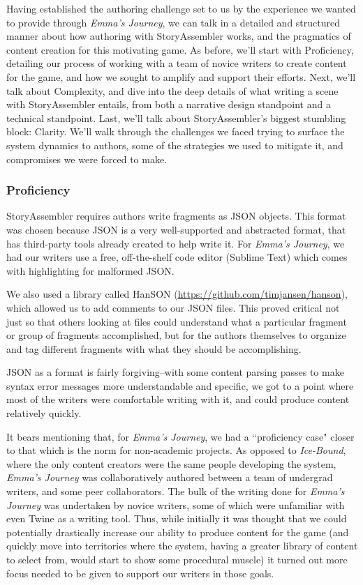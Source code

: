 Having established the authoring challenge set to us by the experience we wanted to provide through \textit{Emma's Journey}, we can talk in a detailed and structured manner about how authoring with StoryAssembler works, and the pragmatics of content creation for this motivating game. As before, we'll start with Proficiency, detailing our process of working with a team of novice writers to create content for the game, and how we sought to amplify and support their efforts. Next, we'll talk about Complexity, and dive into the deep details of what writing a scene with StoryAssembler entails, from both a narrative design standpoint and a technical standpoint. Last, we'll talk about StoryAssembler's biggest stumbling block: Clarity. We'll walk through the challenges we faced trying to surface the system dynamics to authors, some of the strategies we used to mitigate it, and compromises we were forced to make.

\subsubsection{Proficiency}

StoryAssembler requires authors write fragments as JSON objects. This format was chosen because JSON is a very well-supported and abstracted format, that has third-party tools already created to help write it. For \textit{Emma's Journey}, we had our writers use a free, off-the-shelf code editor (Sublime Text) which comes with highlighting for malformed JSON.

We also used a library called HanSON (\url{https://github.com/timjansen/hanson}), which allowed us to add comments to our JSON files. This proved critical not just so that others looking at files could understand what a particular fragment or group of fragments accomplished, but for the authors themselves to organize and tag different fragments with what they should be accomplishing.

JSON as a format is fairly forgiving--with some content parsing passes to make syntax error messages more understandable and specific, we got to a point where most of the writers were comfortable writing with it, and could produce content relatively quickly.

It bears mentioning that, for \textit{Emma's Journey}, we had a ``proficiency case" closer to that which is the norm for non-academic projects. As opposed to \textit{Ice-Bound}, where the only content creators were the same people developing the system, \textit{Emma's Journey} was collaboratively authored between a team of undergrad writers, and some peer collaborators. The bulk of the writing done for \textit{Emma's Journey} was undertaken by novice writers, some of which were unfamiliar with even Twine as a writing tool. Thus, while initially it was thought that we could potentially drastically increase our ability to produce content for the game (and quickly move into territories where the system, having a greater library of content to select from, would start to show some procedural muscle) it turned out more focus needed to be given to support our writers in those goals.

